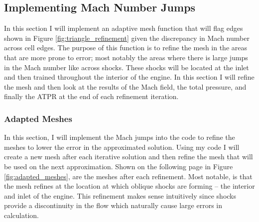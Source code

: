 \pagebreak
\subsection{Implementing Mach Number Jumps}

In this section I will implement an adaptive mesh function that will flag edges shown in Figure \ref{fig:triangle_refinement} given the discrepancy in Mach number across cell edges. The purpose of this function is to refine the mesh in the areas that are more prone to error; most notably the areas where there is large jumps in the Mach number like across shocks. These shocks will be located at the inlet and then trained throughout the interior of the engine. In this section I will refine the mesh and then look at the results of the Mach field, the total pressure, and finally the ATPR at the end of each refinement iteration.

\subsubsection{Adapted Meshes}
In this section, I will implement the Mach jumps into the code to refine the meshes to lower the error in the approximated solution. Using my code I will create a new mesh after each iterative solution and then refine the mesh that will be used on the next approximation. Shown on the following page in Figure \ref{fig:adapted_meshes}, are the meshes after each refinement. Most notable, is that the mesh refines at the location at which oblique shocks are forming -- the interior and inlet of the engine. This refinement makes sense intuitively since shocks provide a discontinuity in the flow which naturally cause large errors in calculation.


